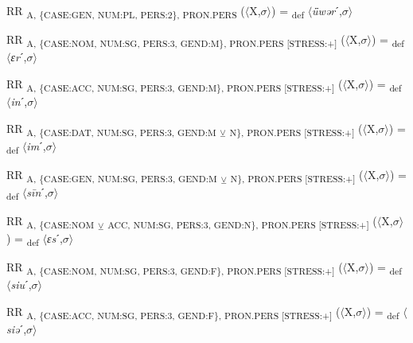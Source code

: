 {\begin{exe}
 RR \textsubscript{A, \{CASE:GEN, NUM:PL, PERS:2\}, PRON.PERS} ($\langle$X,$\sigma $$\rangle$) = \textsubscript{def} $\langle$\textit{ǖwər}ˊ,$\sigma $$\rangle$
\end{exe}

\begin{exe}
 RR \textsubscript{A, \{CASE:NOM, NUM:SG, PERS:3, GEND:M\}, PRON.PERS [STRESS:+]} ($\langle$X,$\sigma $$\rangle$) = \textsubscript{def} $\langle$\textit{ɛr}ˊ,$\sigma $$\rangle$
\end{exe}

\begin{exe}
 RR \textsubscript{A, \{CASE:ACC, NUM:SG, PERS:3, GEND:M\}, PRON.PERS [STRESS:+]} ($\langle$X,$\sigma $$\rangle$) = \textsubscript{def} $\langle$\textit{in}ˊ,$\sigma $$\rangle$
\end{exe}

\begin{exe}
 RR \textsubscript{A, \{CASE:DAT, NUM:SG, PERS:3, GEND:M} \textsubscript{${\veebar}$}\textsubscript{ N\}, PRON.PERS [STRESS:+]} ($\langle$X,$\sigma $$\rangle$) = \textsubscript{def} $\langle$\textit{im}ˊ,$\sigma $$\rangle$
\end{exe}

\begin{exe}
 RR \textsubscript{A, \{CASE:GEN, NUM:SG, PERS:3, GEND:M} \textsubscript{${\veebar}$}\textsubscript{ N\}, PRON.PERS [STRESS:+]} ($\langle$X,$\sigma $$\rangle$) = \textsubscript{def} $\langle$\textit{s\=in}ˊ,$\sigma $$\rangle$
\end{exe}

\begin{exe}
 RR \textsubscript{A, \{CASE:NOM} \textsubscript{${\veebar}$}\textsubscript{ ACC, NUM:SG, PERS:3, GEND:N\}, PRON.PERS [STRESS:+]} ($\langle$X,$\sigma $$\rangle$) = \textsubscript{def} $\langle$\textit{ɛs}ˊ,$\sigma $$\rangle$
\end{exe}

\begin{exe}
 RR \textsubscript{A, \{CASE:NOM, NUM:SG, PERS:3, GEND:F\}, PRON.PERS [STRESS:+]} ($\langle$X,$\sigma $$\rangle$) = \textsubscript{def} $\langle$\textit{siu}ˊ,$\sigma $$\rangle$
\end{exe}

\begin{exe}
 RR \textsubscript{A, \{CASE:ACC, NUM:SG, PERS:3, GEND:F\}, PRON.PERS [STRESS:+]} ($\langle$X,$\sigma $$\rangle$) = \textsubscript{def} $\langle$\textit{siə}ˊ,$\sigma $$\rangle$
\end{exe}

}
